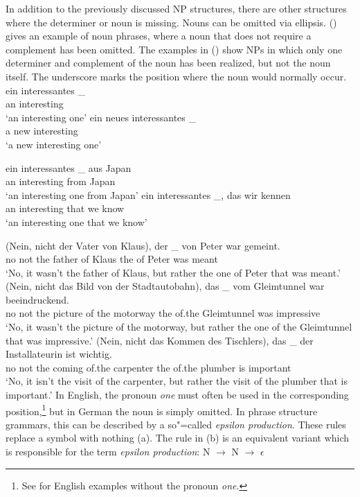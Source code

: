 In addition to the previously discussed NP structures, there are other structures where the determiner or noun is missing.
Nouns can be omitted via ellipsis. () gives an example of noun phrases, where a noun that does not require a complement
has been omitted. The examples in () show NPs in which only one determiner and complement of the noun has been realized,
but not the noun itself. The underscore marks the position where the noun would normally occur. 
\eal
\label{ex-nounless-np}
\ex 
\gll ein interessantes \_\\
     an  interesting\\
\glt `an interesting one'
\ex 
\gll ein neues interessantes \_\\
     a   new   interesting\\
\glt `a new interesting one'

\ex 
\gll ein interessantes \_ aus  Japan\\
     an  interesting   {} from Japan\\
\glt `an interesting one from Japan'
\ex 
\gll ein interessantes \_, das  wir kennen\\
     an  interesting   {}  that we  know\\
\glt `an interesting one that we know'
\zl

\eal
\label{ex-nounless-np-relational-noun}
\ex 
\gll (Nein, nicht der Vater von Klaus), der \_ von Peter war gemeint.\\
	\spacebr{}no not the father of Klaus the {} of Peter was meant\\
\glt `No, it wasn't the father of Klaus, but rather the one of Peter that was meant.'
\ex 
\gll (Nein, nicht das Bild von der Stadtautobahn), das \_ vom Gleimtunnel war beeindruckend.\\
	 \spacebr{}no not the picture of the motorway the {} of.the Gleimtunnel was impressive\\
\glt `No, it wasn't the picture of the motorway, but rather the one of the Gleimtunnel that was impressive.'
\ex 
\gll (Nein, nicht das Kommen des Tischlers), das \_ der Installateurin ist wichtig.\\
	 \spacebr{}no not the coming of.the carpenter the {} of.the plumber is important\\
\glt `No, it isn't the visit of the carpenter, but rather the visit of the plumber that is important.'
\zl
In English, the pronoun
\emph{one} must often be used in the corresponding position,\footnote{%
  See \citet[Section~4.12]{FLGR2012a} for English examples without the
  pronoun \emph{one}.
} but in German the noun is
simply omitted.
In phrase structure grammars, this can be described by a so"=called \emph{epsilon production}.
These rules replace a symbol with nothing (a). The rule in (b) is an equivalent variant which is responsible for the term \emph{epsilon production}:
\eal
\label{np-epsilon}
\ex N $\to$
\ex N $\to$ $\epsilon$
\zl 

